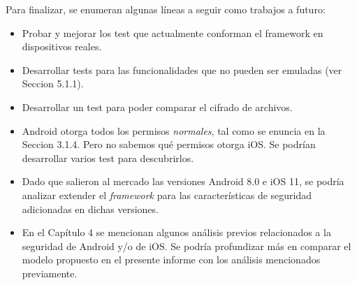 Para finalizar, se enumeran algunas líneas a seguir como trabajos a futuro:
\begin{itemize}
    \item Probar y mejorar los test que actualmente conforman el framework en dispositivos reales.
    \item Desarrollar tests para las funcionalidades que no pueden ser emuladas (ver Seccion 5.1.1).
    \item Desarrollar un test para poder comparar el cifrado de archivos.
    \item Android otorga todos los permisos \emph{normales}, tal como se enuncia en la Seccion 3.1.4. Pero no sabemos qué permisos otorga iOS. Se podrían desarrollar varios test para descubrirlos.
    \item Dado que salieron al mercado las versiones Android 8.0 e iOS 11, se podría analizar extender el \emph{framework} para las características de seguridad adicionadas en dichas versiones.
    \item En el Capítulo 4 se mencionan algunos análisis previos relacionados a la seguridad de Android y/o de iOS. Se podría profundizar más en comparar el modelo propuesto en el presente informe con los análisis mencionados previamente.
\end{itemize}

